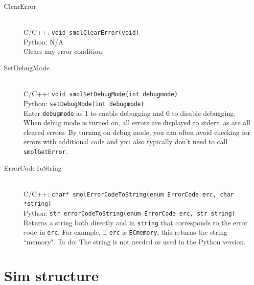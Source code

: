 \documentclass {scrbook}
\newcommand {\ttt} {\texttt}
\begin{document}
\begin{description}
\item[ClearError]
\hfill \\
C/C++: \ttt{void smolClearError(void)}\\
Python: N/A\\
Clears any error condition.

\item[SetDebugMode]
\hfill \\
C/C++: \ttt{void smolSetDebugMode(int debugmode)}\\
Python: \ttt{setDebugMode(int debugmode)}\\
Enter \ttt{debugmode} as 1 to enable debugging and 0 to disable debugging. When debug mode is turned on, all errors are displayed to stderr, as are all cleared errors. By turning on debug mode, you can often avoid checking for errors with additional code and you also typically don't need to call \ttt{smolGetError}.

\item[ErrorCodeToString]
\hfill \\
C/C++: \ttt{char* smolErrorCodeToString(enum ErrorCode erc, char *string)}\\
Python: \ttt{str errorCodeToString(enum ErrorCode erc, str string)}\\
Returns a string both directly and in \ttt{string} that corresponds to the error code in \ttt{erc}. For example, if \ttt{erc} is \ttt{ECmemory}, this returns the string ``memory". To do: The string is not needed or used in the Python version.

\end{description}

\section{Sim structure}
\end{document}

